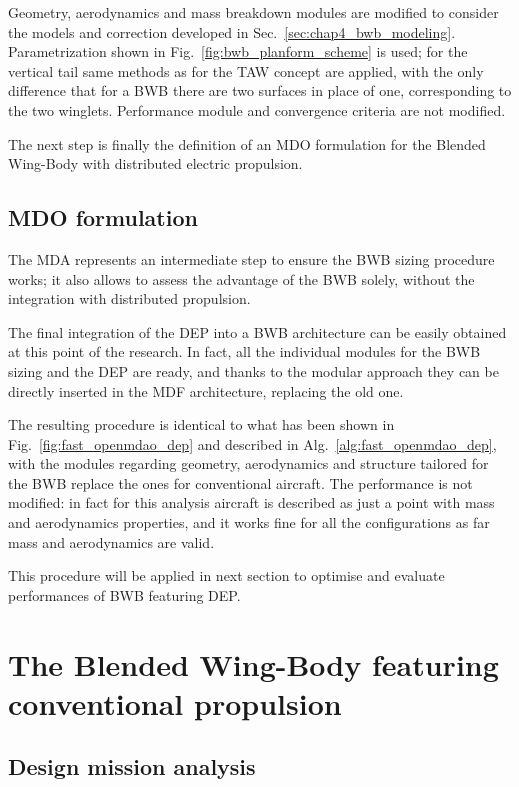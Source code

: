Geometry, aerodynamics and mass breakdown modules are modified to consider the models and correction developed in Sec.~\ref{sec:chap4_bwb_modeling}. 
Parametrization shown in Fig.~\ref{fig:bwb_planform_scheme} is used; for the vertical tail same methods as for the TAW concept are applied, with the only difference that for a BWB there are two surfaces in place of one, corresponding to the two winglets. 
Performance module and convergence criteria are not modified. 

The next step is finally the definition of an MDO formulation for the Blended Wing-Body with distributed electric propulsion.

\subsection{MDO formulation}
\label{subsec:chap4_bwb_mdo}

The MDA represents an intermediate step to ensure the BWB sizing procedure works; it also allows to assess the advantage of the BWB solely, without the integration with distributed propulsion. 

The final integration of the DEP into a BWB architecture can be easily obtained at this point of the research. 
In fact, all the individual modules for the BWB sizing and the DEP are ready, and thanks to the modular approach they can be directly inserted in the MDF architecture, replacing the old one. 

The resulting procedure is identical to what has been shown in Fig.~\ref{fig:fast_openmdao_dep} and described in Alg.~\ref{alg:fast_openmdao_dep}, with the modules regarding geometry, aerodynamics and structure tailored for the BWB replace the ones for conventional aircraft. 
The performance is not modified: in fact for this analysis aircraft is described as just a point with mass and aerodynamics properties, and it works fine for all the configurations as far mass and aerodynamics are valid. 

This procedure will be applied in next section to optimise and evaluate performances of BWB featuring DEP. 

\section{The Blended Wing-Body featuring conventional propulsion}
\label{sec:chap4_bwb_mda_results}

\subsection{Design mission analysis}
\label{subsec:chap4_bwb_mda_design_mission}

